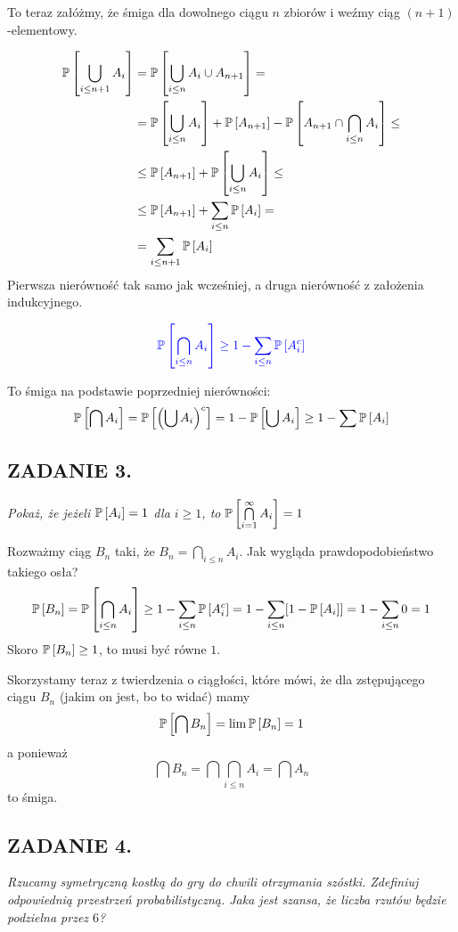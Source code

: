 \documentclass{article}
\begin{document}
To teraz załóżmy, że śmiga dla dowolnego ciągu $n$ zbiorów i weźmy ciąg $(n+1)$-elementowy. 

\begin{align*}
    \mathbb{P}\left[\bigcup\limits_{i\leq n+1} A_i\right]&=\mathbb{P}\left[\bigcup\limits_{i\leq n}A_i\cup A_{n+1}\right]=\\
    &=\mathbb{P}\left[\bigcup\limits_{i\leq n}A_i\right]+\mathbb{P}\left[A_{n+1}\right]-\mathbb{P}\left[A_{n+1}\cap\bigcap\limits_{i\leq n}A_i\right]\leq \\
    &\leq\mathbb{P}\left[A_{n+1}\right]+\mathbb{P}\left[\bigcup\limits_{i\leq n}A_i\right]\leq\\
    &\leq \mathbb{P}\left[A_{n+1}\right]+\sum\limits_{i\leq n}\mathbb{P}\left[A_i\right]=\\
    &=\sum\limits_{i\leq n+1}\mathbb{P}\left[A_i\right]
\end{align*}
Pierwsza nierówność tak samo jak wcześniej, a druga nierówność z założenia indukcyjnego.

$$\color{blue}\mathbb{P}\left[\bigcap\limits_{i\leq n}A_i\right]\geq 1-\sum\limits_{i\leq n}\mathbb{P}\left[A_i^c\right]$$

To śmiga na podstawie poprzedniej nierówności:
\begin{align*}
    \mathbb{P}\left[\bigcap A_i\right]=\mathbb{P}\left[\left(\bigcup A_i\right)^c\right]=1-\mathbb{P}\left[\bigcup A_i\right]\geq1-\sum\mathbb{P}\left[A_i\right]
\end{align*}

\subsection*{ZADANIE 3.}
\emph{Pokaż, że jeżeli $\mathbb{P}\left[A_i\right]=1$ dla $i\geq 1$, to $\mathbb{P}\left[\bigcap\limits_{i=1}^\infty A_i\right]=1$}
\medskip

Rozważmy ciąg $B_n$ taki, że $B_n=\bigcap\limits_{i\leq n}A_i$. Jak wygląda prawdopodobieństwo takiego osła?
\begin{align*}
    \mathbb{P}\left[B_n\right]=\mathbb{P}\left[\bigcap\limits_{i\leq n}A_i\right]\geq 1-\sum\limits_{i\leq n}\mathbb{P}\left[A_i^c\right]=1-\sum\limits_{i\leq n}[1-\mathbb{P}\left[A_i\right]]=1-\sum\limits_{i\leq n}0=1
\end{align*}
Skoro $\mathbb{P}\left[B_n\right]\geq 1$, to musi być równe $1$.

Skorzystamy teraz z twierdzenia o ciągłości, które mówi, że dla zstępującego ciągu $B_n$ (jakim on jest, bo to widać) mamy
$$\mathbb{P}\left[\bigcap B_n\right]=\lim\mathbb{P}\left[B_n\right]=1$$
a ponieważ
$$\bigcap B_n=\bigcap \bigcap\limits_{i\leq n}A_i=\bigcap A_n$$
to śmiga.

\subsection*{ZADANIE 4.}
\emph{Rzucamy symetryczną kostką do gry do chwili otrzymania szóstki. Zdefiniuj odpowiednią przestrzeń probabilistyczną. Jaka jest szansa, że liczba rzutów będzie podzielna przez $6$?}
\medskip
\end{document}
